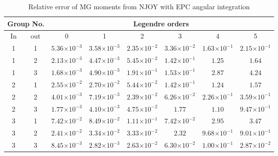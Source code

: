 \documentclass[review]{elsarticle}
\newcommand{\e}[1]{\ensuremath{\times10^{#1}}}
\begin{document}
\begin{table}[h]
\centering
\caption{Relative error of MG moments from NJOY with EPC angular integration}\normalsize
\label{tb:njoyerr}
\begin{adjustwidth}{-.5cm}{}
\begin{tabular}{|c|c|c|c|c|c|c|c|}
\hline
\multicolumn{2}{|c|}{Group No.} & \multicolumn{6}{c|}{Legendre orders}\\
\hline
In & out & 0 & 1 & 2 & 3 & 4 & 5\\ 
\hline
1 & 1 & \cellcolor{green} $5.36\e{-3}$ & \cellcolor{green} $3.58\e{-3}$ & \cellcolor{green} $2.35\e{-2}$ & \cellcolor{green} $3.36\e{-2}$ & \cellcolor{green} $1.63\e{-1}$ & \cellcolor{yellow} $2.15\e{-1}$\\
\hline
1 & 2 & \cellcolor{green} $2.13\e{-3}$ & \cellcolor{green} $4.47\e{-3}$ & \cellcolor{green} $5.45\e{-2}$ & \cellcolor{cyan} $1.42\e{-1}$ & \cellcolor{red} $1.25$ & \cellcolor{red} $1.64$\\
\hline
1 & 3 & \cellcolor{green} $1.68\e{-3}$ & \cellcolor{green} $4.90\e{-3}$ & \cellcolor{cyan} $1.91\e{-1}$ & \cellcolor{cyan} $1.53\e{-1}$ & \cellcolor{red} $2.87$ & \cellcolor{red} $4.24$\\
\hline
2 & 1 & \cellcolor{green} $2.55\e{-2}$ & \cellcolor{green} $2.70\e{-2}$ & \cellcolor{green} $5.44\e{-2}$ & \cellcolor{cyan} $1.42\e{-1}$ & \cellcolor{red} $1.24$ & \cellcolor{red} $1.57$\\
\hline
2 & 2 & \cellcolor{green} $4.01\e{-3}$ & \cellcolor{green} $7.19\e{-3}$ & \cellcolor{green} $2.39\e{-2}$ & \cellcolor{green} $6.26\e{-2}$ & \cellcolor{yellow} $2.26\e{-1}$ & \cellcolor{yellow} $3.59\e{-1}$\\
\hline
2 & 3 & \cellcolor{green} $1.77\e{-3}$ & \cellcolor{green} $4.10\e{-3}$ & \cellcolor{green} $4.75\e{-2}$ & \cellcolor{red} $1.77$ & \cellcolor{red} $1.10$ & \cellcolor{yellow} $9.47\e{-1}$\\
\hline
3 & 1 & \cellcolor{green} $7.42\e{-2}$ & \cellcolor{green} $8.49\e{-2}$ & \cellcolor{cyan} $1.11\e{-1}$ & \cellcolor{green} $7.42\e{-2}$ & \cellcolor{red} $2.95$ & \cellcolor{red} $3.47$\\
\hline
3 & 2 & \cellcolor{green} $2.41\e{-2}$ & \cellcolor{green} $3.34\e{-2}$ & \cellcolor{green} $3.33\e{-2}$ & \cellcolor{red} $2.32$ & \cellcolor{yellow} $9.68\e{-1}$ & \cellcolor{yellow} $9.01\e{-1}$\\
\hline
3 & 3 & \cellcolor{green} $8.45\e{-3}$ & \cellcolor{green} $2.82\e{-3}$ & \cellcolor{green} $2.63\e{-2}$ & \cellcolor{green} $6.30\e{-2}$ & \cellcolor{cyan} $1.00\e{-1}$ & \cellcolor{green} $2.87\e{-2}$\\
\hline
\end{tabular}
\end{adjustwidth}
\end{table}
\end{document}
